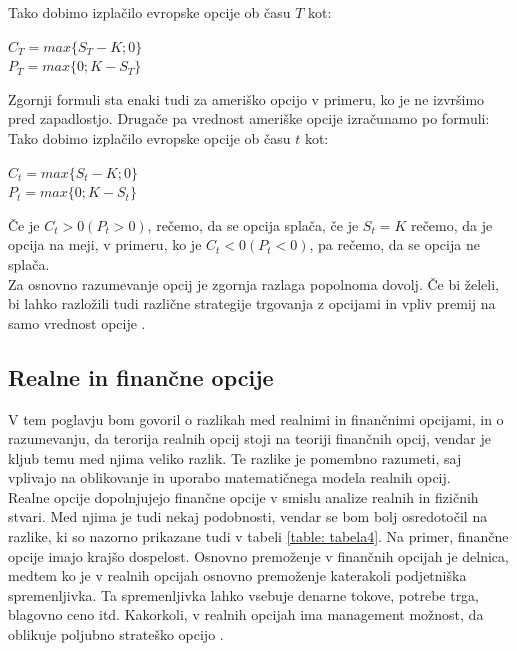Tako dobimo izplačilo evropske opcije ob času $T$ kot:
\begin{center}
$C_T = max\{S_T - K; 0\}$\\
$P_T = max\{0; K - S_T\}$
\end{center}  
Zgornji formuli sta enaki tudi za ameriško opcijo v primeru, ko je ne izvršimo pred zapadlostjo. Drugače pa vrednost ameriške opcije izračunamo po formuli:\\
Tako dobimo izplačilo evropske opcije ob času $t$ kot:
\begin{center}
$C_t = max\{S_t - K; 0\}$\\
$P_t = max\{0; K - S_t\}$
\end{center}  
Če je $C_t>0 (P_t>0)$, rečemo, da se opcija splača, če je $S_t=K$ rečemo, da je opcija na meji, v primeru, ko je $C_t<0 (P_t<0)$, pa rečemo, da se opcija ne splača.\\
Za osnovno razumevanje opcij je zgornja razlaga popolnoma dovolj. Če bi želeli, bi lahko razložili tudi različne strategije trgovanja z opcijami in vpliv premij na samo vrednost opcije \cite[str. 54-58]{Kosir}.

\subsection{Realne in finančne opcije}
V tem poglavju bom govoril o razlikah med realnimi in finančnimi opcijami, in o razumevanju, da terorija realnih opcij stoji na teoriji finančnih opcij, vendar je kljub temu med njima veliko razlik. Te razlike je pomembno razumeti, saj vplivajo na oblikovanje in uporabo matematičnega modela realnih opcij. \\

Realne opcije dopolnjujejo finančne opcije v smislu analize realnih in fizičnih stvari. Med njima je tudi nekaj podobnosti, vendar se bom bolj osredotočil na razlike, ki so nazorno prikazane tudi v tabeli \ref{table: tabela4}. Na primer, finančne opcije imajo krajšo dospelost. Osnovno premoženje v finančnih opcijah je delnica, medtem ko je v realnih opcijah osnovno premoženje katerakoli podjetniška spremenljivka. Ta spremenljivka lahko vsebuje denarne tokove, potrebe trga, blagovno ceno itd. Kakorkoli, v realnih opcijah ima management možnost, da oblikuje poljubno strateško opcijo \cite[str. 109, 110]{Mun}.
\pagebreak

